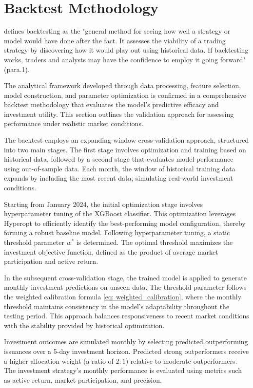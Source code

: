 \section{Backtest Methodology}

\textcite{Chen2024Backtesting:Downsides} defines backtesting as the "general method for seeing how well a strategy or model would have done after the fact. It assesses the viability of a trading strategy by discovering how it would play out using historical data. If backtesting works, traders and analysts may have the confidence to employ it going forward" (para.1).

The analytical framework developed through data processing, feature selection, model construction, and parameter optimization is confirmed in a comprehensive backtest methodology that evaluates the model's predictive efficacy and investment utility. This section outlines the validation approach for assessing performance under realistic market conditions.

The backtest employs an expanding-window cross-validation approach, structured into two main stages. The first stage involves optimization and training based on historical data, followed by a second stage that evaluates model performance using out-of-sample data. Each month, the window of historical training data expands by including the most recent data, simulating real-world investment conditions.

Starting from January 2024, the initial optimization stage involves hyperparameter tuning of the XGBoost classifier. This optimization leverages Hyperopt to efficiently identify the best-performing model configuration, thereby forming a robust baseline model. Following hyperparameter tuning, a static threshold parameter $w^*$ is determined. The optimal threshold maximizes the investment objective function, defined as the product of average market participation and active return.

In the subsequent cross-validation stage, the trained model is applied to generate monthly investment predictions on unseen data. The threshold parameter follows the weighted calibration formula \ref{eq: weighted_calibration}, where the monthly threshold maintains consistency in the model's adaptability throughout the testing period. This approach balances responsiveness to recent market conditions with the stability provided by historical optimization.

Investment outcomes are simulated monthly by selecting predicted outperforming issuances over a 5-day investment horizon. Predicted strong outperformers receive a higher allocation weight (a ratio of $2:1$) relative to moderate outperformers. The investment strategy's monthly performance is evaluated using metrics such as active return, market participation, and precision.

